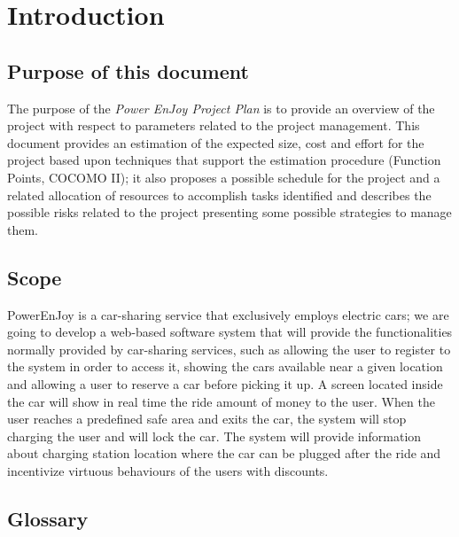 \section{Introduction}
\subsection{Purpose of this document}
The purpose of the \emph{Power EnJoy Project Plan} is to provide an overview of the project with respect to parameters related to the project management. This document provides an estimation of the expected size, cost and effort for the project based upon techniques that support the estimation
procedure (Function Points, COCOMO II); it also proposes a possible schedule for the project and a related allocation of resources to accomplish tasks identified and describes the possible risks related to the project presenting some possible strategies to manage them.


\subsection{Scope}
PowerEnJoy is a car-sharing service that exclusively employs electric cars; we are going to develop a web-based software system that will provide the functionalities normally provided by car-sharing services, such as allowing the user to register to the system in order to access it, showing the cars available near a given location and allowing a user to reserve a car before picking it up.
A screen located inside the car will show in real time the ride amount of money to the user. When the user reaches a predefined safe area and exits the car, the system will stop charging the user and will lock the car. The system will provide information about charging station location where the car can be plugged after the ride and incentivize virtuous behaviours of the users with discounts.

\subsection{Glossary}
